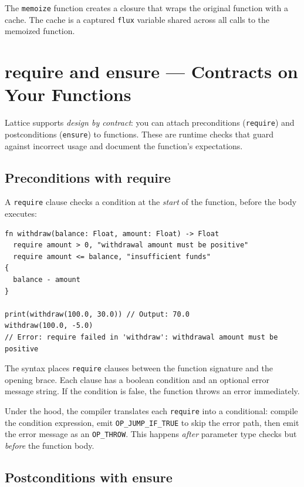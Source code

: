 The \lstinline|memoize| function creates a closure that wraps the original function with a cache. The cache is a captured \lstinline|flux| variable shared across all calls to the memoized function.

\section{require and ensure --- Contracts on Your Functions}\label{sec:contracts}

Lattice supports \emph{design by contract}: you can attach preconditions (\lstinline|require|) and postconditions (\lstinline|ensure|) to functions. These are runtime checks that guard against incorrect usage and document the function's expectations.

\subsection{Preconditions with require}\label{sec:require}

A \lstinline|require| clause checks a condition at the \emph{start} of the function, before the body executes:

\begin{lstlisting}[language=Lattice, caption={require preconditions}]
fn withdraw(balance: Float, amount: Float) -> Float
  require amount > 0, "withdrawal amount must be positive"
  require amount <= balance, "insufficient funds"
{
  balance - amount
}

print(withdraw(100.0, 30.0)) // Output: 70.0
withdraw(100.0, -5.0)
// Error: require failed in 'withdraw': withdrawal amount must be positive
\end{lstlisting}

The syntax places \lstinline|require| clauses between the function signature and the opening brace. Each clause has a boolean condition and an optional error message string. If the condition is false, the function throws an error immediately.

Under the hood, the compiler translates each \lstinline|require| into a conditional: compile the condition expression, emit \lstinline|OP_JUMP_IF_TRUE| to skip the error path, then emit the error message as an \lstinline|OP_THROW|. This happens \emph{after} parameter type checks but \emph{before} the function body.

\subsection{Postconditions with ensure}\label{sec:ensure}

